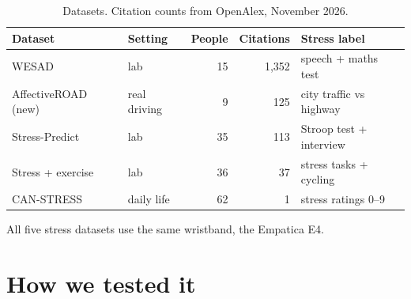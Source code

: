 \documentclass{article}
\begin{document}
\begin{table}[H]
\centering\small
\caption{Datasets. Citation counts from OpenAlex, November 2026.}
\begin{tabular}{llrrl}
\toprule
Dataset & Setting & People & Citations & Stress label \\
\midrule
WESAD~\cite{wesad} & lab & 15 & 1{,}352 & speech + maths test \\
AffectiveROAD~\cite{affectiveroad} (new) & real driving & 9 & 125 & city traffic vs highway \\
Stress-Predict~\cite{stresspredict} & lab & 35 & 113 & Stroop test + interview \\
Stress + exercise~\cite{stressexercise} & lab & 36 & 37 & stress tasks + cycling \\
CAN-STRESS~\cite{canstress} & daily life & 62 & 1 & stress ratings 0--9 \\
\bottomrule
\end{tabular}
\end{table}

All five stress datasets use the same wristband, the Empatica E4.

\section{How we tested it}
\end{document}

